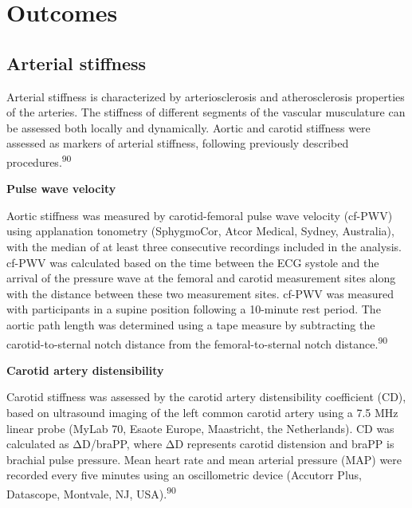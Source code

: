 \documentclass[
  a4paper,
  headsepline=true,
  open=left]{scrbook}
\begin{document}
\hypertarget{outcomes}{%
\section{Outcomes}\label{outcomes}}

\hypertarget{arterial-stiffness}{%
\subsection{Arterial stiffness}\label{arterial-stiffness}}

Arterial stiffness is characterized by arteriosclerosis and
atherosclerosis properties of the arteries. The stiffness of different
segments of the vascular musculature can be assessed both locally and
dynamically. Aortic and carotid stiffness were assessed as markers of
arterial stiffness, following previously described
procedures.\textsuperscript{90}

\textbf{Pulse wave velocity}

Aortic stiffness was measured by carotid-femoral pulse wave velocity
(cf-PWV) using applanation tonometry (SphygmoCor, Atcor Medical, Sydney,
Australia), with the median of at least three consecutive recordings
included in the analysis. cf-PWV was calculated based on the time
between the ECG systole and the arrival of the pressure wave at the
femoral and carotid measurement sites along with the distance between
these two measurement sites. cf-PWV was measured with participants in a
supine position following a 10-minute rest period. The aortic path
length was determined using a tape measure by subtracting the
carotid-to-sternal notch distance from the femoral-to-sternal notch
distance.\textsuperscript{90}

\textbf{Carotid artery distensibility}

Carotid stiffness was assessed by the carotid artery distensibility
coefficient (CD), based on ultrasound imaging of the left common carotid
artery using a 7.5 MHz linear probe (MyLab 70, Esaote Europe,
Maastricht, the Netherlands). CD was calculated as ΔD/braPP, where ΔD
represents carotid distension and braPP is brachial pulse pressure. Mean
heart rate and mean arterial pressure (MAP) were recorded every five
minutes using an oscillometric device (Accutorr Plus, Datascope,
Montvale, NJ, USA).\textsuperscript{90}
\end{document}
